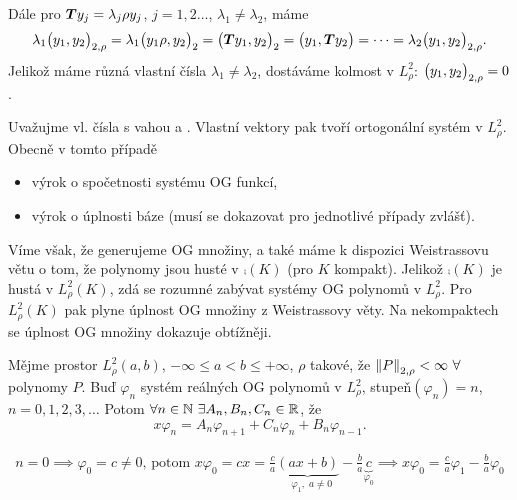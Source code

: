 Dále pro $\boldsymbol{T}y_j=\lambda_j\rho y_j$, $j=1,2\dots$, $\lambda_1\neq\lambda_2$, máme
\begin{equation}
    \lambda_1\big( y_1, y_2 \big)_{2,\rho}= \lambda_1\big( y_1\rho, y_2 \big)_2 = \big( \boldsymbol{T}y_1, y_2 \big)_2 = \big( y_1, \boldsymbol{T}y_2 \big) = \dots = \lambda_2\big( y_1, y_2 \big)_{2,\rho}.
    \label{eq:ortogonalita}
\end{equation}Jelikož máme různá vlastní čísla $\lambda_1\neq \lambda_2$, dostáváme kolmost v $L_\rho^2$: $\big( y_1, y_2 \big)_{2,\rho}=0$.

 Uvažujme vl. čísla s vahou a . Vlastní vektory pak tvoří ortogonální systém v $L_\rho^2$. Obecně v tomto případě 
\begin{itemize}
    \item výrok o spočetnosti systému OG funkcí,
    \item výrok o úplnosti báze (musí se dokazovat pro jednotlivé případy zvlášť).
\end{itemize}

Víme však, že generujeme OG množiny, a také máme k dispozici Weistrassovu větu o tom, že polynomy jsou husté v $\comp(K)$ (pro $K$ kompakt). Jelikož $\comp(K)$ je hustá v $L_\rho^2(K)$, zdá se rozumné zabývat systémy OG polynomů v $L_\rho^2$. Pro $L_\rho^2(K)$ pak plyne úplnost OG množiny z Weistrassovy věty. Na nekompaktech se úplnost OG množiny dokazuje obtížněji.

\begin{theorem}
    Mějme prostor $L^2_{\rho}(a,b)$, $-\infty \leq a < b \leq +\infty$, $\rho$ takové, že $\left\lVert P\right\rVert_{2,\rho} < \infty ~ \forall$ polynomy $P$. Buď $\varphi_n$ systém reálných OG polynomů v $L^2_{\rho}$, stupeň$(\varphi_n) = n$, $n = 0, 1, 2, 3,\dots$
    Potom $\forall n \in \mathbb{N} ~ \exists A_n, B_n, C_n \in \mathbb{R}$, že
    \begin{equation}
        x \varphi_n = A_n \varphi_{n+1} + C_n \varphi_{n} + B_n \varphi_{n-1}.
    \end{equation}
\end{theorem}

\begin{remark}
    \begin{align*}
        n=0 \implies \varphi_0 = c \neq 0\text{, potom } x \varphi_0 = cx = \frac{c}{a}\underbrace{(ax + b)}_{\;\;\;\varphi_1,\; a\neq0} - \frac{b}{a} \underbrace{c}_{\varphi_0} \implies x \varphi_0 = \frac{c}{a} \varphi_1 - \frac{b}{a} \varphi_0
    \end{align*}
\end{remark}

